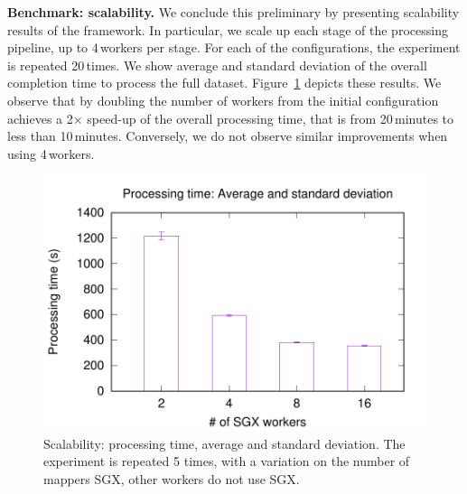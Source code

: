 

\textbf{Benchmark: scalability.} We conclude this preliminary by presenting scalability results of the \SYS framework.
In particular, we scale up each stage of the processing pipeline, up to 4\,workers per stage.
For each of the configurations, the experiment is repeated 20\,times.
We show average and standard deviation of the overall completion time to process the full dataset.
Figure~\ref{fig:scalability} depicts these results.
We observe that by doubling the number of workers from the initial configuration achieves a 2$\times$ speed-up of the overall processing time, that is from 20\,minutes to less than 10\,minutes.
Conversely, we do not observe similar improvements when using 4\,workers.

\begin{figure}[t!]
  \centering
  \includegraphics[scale=0.5]{plots/secure_streams/scalability/sgxmapper_scalability.pdf}
  \caption{Scalability: processing time, average and standard deviation. The experiment is repeated 5 times, with a variation on the number of mappers SGX, other workers do not use SGX.}
  \label{fig:scalability}
\end{figure}

